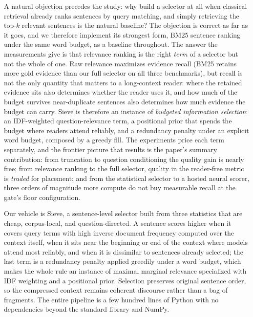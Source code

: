 \documentclass[review,12pt]{elsarticle}
\theoremstyle{remark}
\newcommand{\method}{Sieve}
\begin{document}
A natural objection precedes the study: why build a selector at all
when classical retrieval already ranks sentences by query matching,
and simply retrieving the top-$k$ relevant sentences is the natural
baseline? The objection
is correct as far as it goes, and we therefore implement its strongest
form, BM25 sentence ranking under the same word budget, as a baseline
throughout. The answer the measurements give is that relevance ranking
is the right \emph{term} of a selector but not the whole of one.
Raw relevance maximizes evidence recall (BM25 retains more gold
evidence than our full selector on all three benchmarks), but recall
is not the only quantity that matters to a long-context reader: where
the retained evidence sits also determines whether the reader uses it,
and how much of the budget survives near-duplicate sentences also
determines how much evidence the budget can carry. \method{} is
therefore an instance of \emph{budgeted information selection}: an
IDF-weighted question-relevance term, a positional prior that spends
the budget where readers attend reliably, and a redundancy penalty
under an explicit word budget, composed by a greedy fill. The
experiments price each term separately, and the frontier picture that
results is the paper's summary contribution: from truncation to
question conditioning the quality gain is nearly free; from relevance
ranking to the full selector, quality in the reader-free metric is
\emph{traded} for placement; and from the statistical selector to a
hosted neural scorer, three orders of magnitude more compute do not
buy measurable recall at the gate's floor configuration.

Our vehicle is \method{}, a sentence-level selector built from three
statistics that are cheap, corpus-local, and question-directed. A
sentence scores higher when it covers query terms with high inverse
document frequency computed over the context itself, when it sits near
the beginning or end of the context where models attend most reliably,
and when it is dissimilar to sentences already selected; the last term
is a redundancy penalty applied greedily under a word budget, which
makes the whole rule an instance of maximal marginal relevance
\citep{carbonell1998mmr} specialized with IDF weighting
\citep{robertson2009bm25} and a positional prior. Selection preserves
original sentence order, so the compressed context remains coherent
discourse rather than a bag of fragments. The entire pipeline is a few
hundred lines of Python with no dependencies beyond the standard
library and NumPy.
\end{document}
